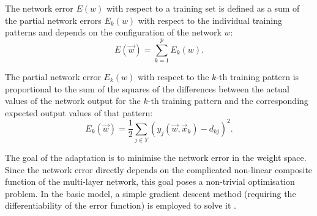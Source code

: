 The network error $ E(w )$ with respect to a training set is defined as a sum of the partial network errors $ E_k(w) $ with respect to the individual training patterns and depends on the configuration of the network $ w $:
$$ E(\vec{w}) = \sum_{k = 1}^{p}{E_k(w)}. $$

The partial network error $ E_k(w) $ with respect to the $ k $-th training pattern is proportional to the sum of the squares of the differences between the actual values of the network output for the $k$-th training pattern and the corresponding expected output values of that pattern:
$$ E_k(\vec{w}) = \frac{1}{2} \sum_{j \in Y}{(y_j(\vec{w}, \vec{x}_k) - d_{kj})^2}. $$

The goal of the adaptation is to minimise the network error in the weight space. Since the network error directly depends on the complicated non-linear composite function of the multi-layer network, this goal poses a non-trivial optimisation problem. In the basic model, a simple gradient descent method (requiring the differentiability of the error function) is employed to solve it \cite{Sima96}.